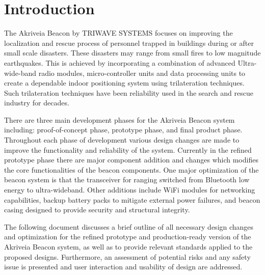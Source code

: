 

\setcounter{section}{0}
\section{Introduction}

\bigskip
The Akriveia Beacon by TRIWAVE SYSTEMS focuses on improving the localization and rescue
process of personnel trapped in buildings during or after small scale disasters. These disasters may range from
small fires to low magnitude earthquakes. This is achieved by incorporating a combination of advanced Ultra-
wide-band radio modules, micro-controller units and data processing units to create a dependable
indoor positioning system using trilateration techniques. Such trilateration techniques have been reliability 
used in the search and rescue industry for decades. 

\bigskip
There are three main development phases for the Akriveia Beacon system including: proof-of-concept phase, prototype phase, and final product phase. Throughout each phase of development various design changes are made to improve the functionality and reliability of the system. Currently in the refined prototype phase there are major component addition and changes which modifies the core functionalities of the beacon components. One major optimization of the beacon system is that the transceiver for ranging switched from  Bluetooth low energy to ultra-wideband. Other additions include WiFi modules for networking capabilities, backup battery packs to mitigate external power failures, and beacon casing designed to provide security and structural integrity. 

\bigskip
The following document discusses a brief outline of all necessary design changes and optimization for the refined prototype and production-ready version of the Akriveia Beacon system, as well as to provide relevant standards applied to the proposed designs. Furthermore, an assessment of potential risks and any safety issue is presented and user interaction and usability of design are addressed.

